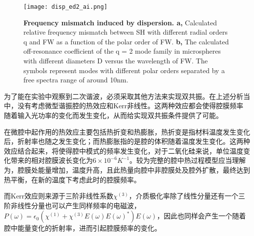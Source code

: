 \begin{figure}
\centering
\texttt{[image: disp\_ed2\_ai.png]}
\caption{\textbf{Frequency mismatch induced by dispersion. a,}   Calculated relative
frequency mismatch between SH with different radial orders q and FW as a function of
the polar order of FW.   \textbf{b,}  The calculated off-resonance coefficient of the
q = 2 mode family in microspheres with different diameters D versus the wavelength of
FW. The symbols represent modes with different polar orders separated by a free spectra
range of around 10nm.}
\label{pic:mode}
\end{figure}

为了能在实验中观察到二次谐波，必须采取其他方法来实现双共振。在上述分析当中，没有考虑微型谐振腔的热效应和Kerr非线性。这两种效应都会使得腔膜频率随着输入光功率的变化而发生变化，从而给实现双共振条件提供了可能。

在微腔中起作用的热效应主要包括热折变和热膨胀，热折变是指材料温度发生变化后，折射率也随之发生变化；而热膨胀指的是腔的体积随着温度发生变化。这两种效应结合起来，将使得腔中模式的频率发生变化，对于二氧化硅来说，单位温度变化带来的相对腔膜波长变化为$6\times 10^{-6} K^{-1}$\cite{nikogosyan2003properties, carmon2004dynamical}。较为完整的腔中热过程模型应当理解为，腔膜处能量增加，温度升高，且此热量向腔中非腔膜处及腔外扩散\cite{ilchenko1992thermal}，最终达到热平衡，在新的温度下考虑此时的腔膜频率。

而Kerr效应则来源于三阶非线性系数$\chi^{(3)}$，介质极化率除了线性分量还有一个三阶非线性分量也可以产生同样频率的电磁波，$P(\omega) = \epsilon_0(\chi^{(1)}+\chi^{(3)}E(\omega)E(\omega)^*)E(\omega)$，因此也同样会产生一个随着腔中能量变化的折射率，进而引起腔膜频率的变化。



